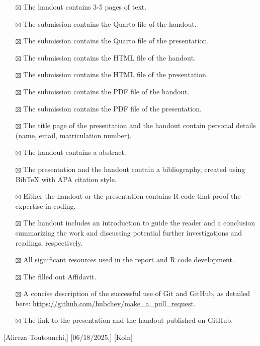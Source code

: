 \documentclass[
  man,
  floatsintext,
  longtable,
  nolmodern,
  notxfonts,
  notimes,
  colorlinks=true,linkcolor=blue,citecolor=blue,urlcolor=blue]{apa7}
\providecommand{\tightlist}{%
  \setlength{\itemsep}{0pt}\setlength{\parskip}{0pt}}
\begin{document}
\begin{itemize}
\tightlist
\item[$\boxtimes$]
  The handout contains 3-5 pages of text.
\item[$\boxtimes$]
  The submission contains the Quarto file of the handout.
\item[$\boxtimes$]
  The submission contains the Quarto file of the presentation.
\item[$\boxtimes$]
  The submission contains the HTML file of the handout.
\item[$\boxtimes$]
  The submission contains the HTML file of the presentation.
\item[$\boxtimes$]
  The submission contains the PDF file of the handout.
\item[$\boxtimes$]
  The submission contains the PDF file of the presentation.
\item[$\boxtimes$]
  The title page of the presentation and the handout contain personal
  details (name, email, matriculation number).
\item[$\boxtimes$]
  The handout contains a abstract.
\item[$\boxtimes$]
  The presentation and the handout contain a bibliography, created using
  BibTeX with APA citation style.
\item[$\boxtimes$]
  Either the handout or the presentation contains R code that proof the
  expertise in coding.
\item[$\boxtimes$]
  The handout includes an introduction to guide the reader and a
  conclusion summarizing the work and discussing potential further
  investigations and readings, respectively.
\item[$\boxtimes$]
  All significant resources used in the report and R code development.
\item[$\boxtimes$]
  The filled out Affidavit.
\item[$\boxtimes$]
  A concise description of the successful use of Git and GitHub, as
  detailed here: \url{https://github.com/hubchev/make_a_pull_request}.
\item[$\boxtimes$]
  The link to the presentation and the handout published on GitHub.
\end{itemize}

{[}Alireza Toutounchi,{]} {[}06/18/2025,{]} {[}Koln{]}
\end{document}
